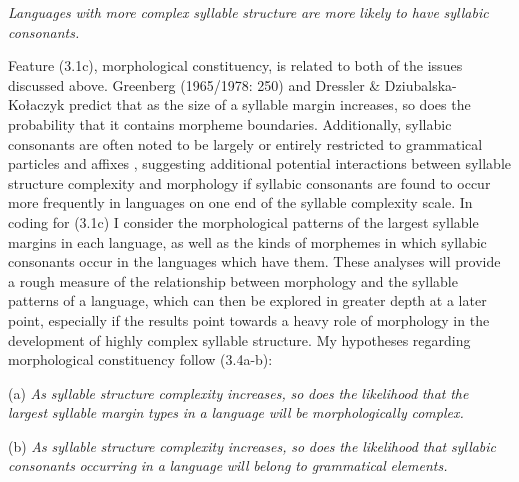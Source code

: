 \ea\label{ex:(3.3)}
   \textit{Languages} \textit{with} \textit{more} \textit{complex} \textit{syllable} \textit{structure} \textit{are} \textit{more} \textit{likely} \textit{to} \textit{have} \textit{syllabic} \textit{consonants.}
\z



  Feature (3.1c), morphological constituency, is related to both of the issues discussed above. Greenberg (1965/1978: 250) and Dressler \& Dziubalska-Kołaczyk  predict that as the size of a syllable margin increases, so does the probability that it contains morpheme boundaries. Additionally, syllabic consonants are often noted to be largely or entirely restricted to grammatical particles and affixes \citep[159]{Bell1978a}, suggesting additional potential interactions between syllable structure complexity and morphology if syllabic consonants are found to occur more frequently in languages on one end of the syllable complexity scale. In coding for (3.1c) I consider the morphological patterns of the largest syllable margins in each language, as well as the kinds of morphemes in which syllabic consonants occur in the languages which have them. These analyses will provide a rough measure of the relationship between morphology and the syllable patterns of a language, which can then be explored in greater depth at a later point, especially if the results point towards a heavy role of morphology in the development of highly complex syllable structure. My hypotheses regarding morphological constituency follow (3.4a-b):



\ea\label{ex:(3.4)}




(a)  \textit{As} \textit{syllable} \textit{structure} \textit{complexity} \textit{increases,} \textit{so} \textit{does} \textit{the} \textit{likelihood} \textit{that} \textit{the} \textit{largest} \textit{syllable} \textit{margin} \textit{types} \textit{in} \textit{a} \textit{language} \textit{will} \textit{be} \textit{morphologically} \textit{complex.} 



(b)  \textit{As} \textit{syllable} \textit{structure} \textit{complexity} \textit{increases,} \textit{so} \textit{does} \textit{the} \textit{likelihood} \textit{that} \textit{syllabic} \textit{consonants} \textit{occurring} \textit{in} \textit{a} \textit{language} \textit{will} \textit{belong} \textit{to} \textit{grammatical} \textit{elements.}

\z


